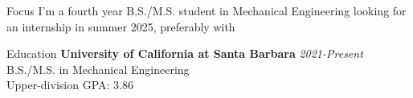 \documentclass[
	11pt, %
]{resume} %
\begin{document}
\begin{rSection}{Focus}
	I'm a fourth year B.S./M.S. student in Mechanical Engineering looking for an internship in summer 2025, preferably with 

\end{rSection}
\begin{rSection}{Education}	
	\textbf{University of California at Santa Barbara} \hfill \textit{2021-Present} \\ 
	B.S./M.S. in Mechanical Engineering \\
	Upper-division GPA: 3.86 \\
\end{rSection}

\end{document}
